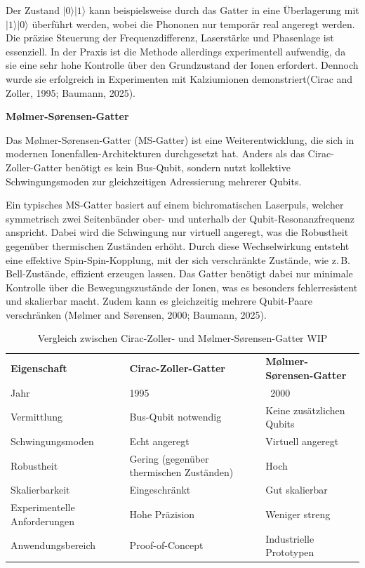 Der Zustand \( \lvert 0 \rangle \lvert 1 \rangle \) kann beispielsweise durch das Gatter in eine Überlagerung mit \( \lvert 1 \rangle \lvert 0 \rangle \) überführt werden, wobei die Phononen nur temporär real angeregt werden. Die präzise Steuerung der Frequenzdifferenz, Laserstärke und Phasenlage ist essenziell. In der Praxis ist die Methode allerdings experimentell aufwendig, da sie eine sehr hohe Kontrolle über den Grundzustand der Ionen erfordert. Dennoch wurde sie erfolgreich in Experimenten mit Kalziumionen demonstriert(Cirac and Zoller, 1995; Baumann, 2025). 

\textbf{Mølmer-Sørensen-Gatter} 


Das Mølmer-Sørensen-Gatter (MS-Gatter) ist eine Weiterentwicklung, die sich in modernen Ionenfallen-Architekturen durchgesetzt hat. Anders als das Cirac-Zoller-Gatter benötigt es kein Bus-Qubit, sondern nutzt kollektive Schwingungsmoden zur gleichzeitigen Adressierung mehrerer Qubits.

Ein typisches MS-Gatter basiert auf einem bichromatischen Laserpuls, welcher symmetrisch zwei Seitenbänder ober- und unterhalb der Qubit-Resonanzfrequenz anspricht. Dabei wird die Schwingung nur virtuell angeregt, was die Robustheit gegenüber thermischen Zuständen erhöht. Durch diese Wechselwirkung entsteht eine effektive Spin-Spin-Kopplung, mit der sich verschränkte Zustände, wie z.\,B. Bell-Zustände, effizient erzeugen lassen. Das Gatter benötigt dabei nur minimale Kontrolle über die Bewegungszustände der Ionen, was es besonders fehlerresistent und skalierbar macht. Zudem kann es gleichzeitig mehrere Qubit-Paare verschränken (Mølmer and Sørensen, 2000; Baumann, 2025).

\begin{table}[ht]
    \centering
    \caption{Vergleich zwischen Cirac-Zoller- und Mølmer-Sørensen-Gatter WIP}
    \label{tab:vergleich_gatter}
    \begin{tabular}{p{4.5cm} p{5.5cm} p{5.5cm}}
        \textbf{Eigenschaft} & \textbf{Cirac-Zoller-Gatter} & \textbf{Mølmer-Sørensen-Gatter} \\
        Jahr & 1995 & ~2000 \\
        Vermittlung & Bus-Qubit notwendig & Keine zusätzlichen Qubits \\
        Schwingungsmoden & Echt angeregt & Virtuell angeregt \\
        Robustheit & Gering (gegenüber thermischen Zuständen) & Hoch \\
        Skalierbarkeit & Eingeschränkt & Gut skalierbar \\
        Experimentelle Anforderungen & Hohe Präzision & Weniger streng \\
        Anwendungsbereich & Proof-of-Concept & Industrielle Prototypen \\
    \end{tabular}
\end{table}


